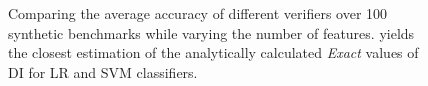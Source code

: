 \begin{figure}[t!]
	\begin{center}	
	\end{center}
	\caption{\footnotesize Comparing the average accuracy of different verifiers over 100 synthetic benchmarks while varying the number of features. {\fvgm} yields the closest estimation of the analytically calculated \textit{Exact} values of DI for LR and SVM classifiers.}\label{fairness_fvgm_fig:sanity_exp}
\end{figure}
